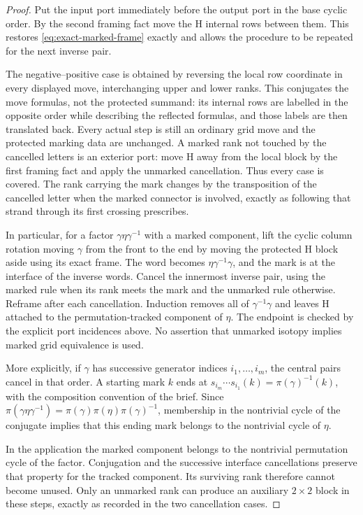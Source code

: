 \documentclass[11pt,a4paper]{article}
\theoremstyle{remark}
\begin{document}
\begin{proof}
Put the input port immediately before the output port in the base
cyclic order.  By the second framing fact move the H internal rows
between them.  This restores \eqref{eq:exact-marked-frame} exactly and
allows the procedure to be repeated for the next inverse pair.

The negative--positive case is obtained by reversing the local row
coordinate in every displayed move, interchanging upper and lower
ranks.  This conjugates the move formulas, not the protected summand:
its internal rows are labelled in the opposite order while describing
the reflected formulas, and those labels are then translated back.
Every actual step is still an ordinary grid move and the protected
marking data are unchanged.  A marked rank not touched by the cancelled letters is an
exterior port: move H away from the local block by the first framing
fact and apply the unmarked cancellation.  Thus every case is covered.
The rank carrying the mark changes by the transposition of the
cancelled letter when the marked connector is involved, exactly as
following that strand through its first crossing prescribes.

In particular, for a factor $\gamma\eta\gamma^{-1}$ with a marked
component, lift the cyclic column rotation moving $\gamma$ from the front to the end
by moving the protected H block aside using its exact frame.  The
word becomes $\eta\gamma^{-1}\gamma$, and the mark is at the interface
of the inverse words.  Cancel the innermost inverse pair, using the
marked rule when its rank meets the mark and the unmarked rule
otherwise.  Reframe after each cancellation.  Induction removes all
of $\gamma^{-1}\gamma$ and leaves H attached to the permutation-tracked
component of $\eta$.  The endpoint is checked by the explicit port
incidences above.  No assertion that unmarked isotopy implies marked
grid equivalence is used.

More explicitly, if $\gamma$ has successive generator indices
$i_1,\ldots,i_m$, the central pairs cancel in that order.  A starting
mark $k$ ends at
$s_{i_m}\cdots s_{i_1}(k)=\pi(\gamma)^{-1}(k)$, with the composition
convention of the brief.  Since
$\pi(\gamma\eta\gamma^{-1})=\pi(\gamma)\pi(\eta)\pi(\gamma)^{-1}$,
membership in the nontrivial cycle of the conjugate implies that this
ending mark belongs to the nontrivial cycle of $\eta$.

In the application the marked component belongs to the nontrivial
permutation cycle of the factor.  Conjugation and the successive
interface cancellations preserve that property for the tracked
component.  Its surviving rank therefore cannot become unused.  Only
an unmarked rank can produce an auxiliary $2\times2$ block in these
steps, exactly as recorded in the two cancellation cases.


\end{proof}
\end{document}
